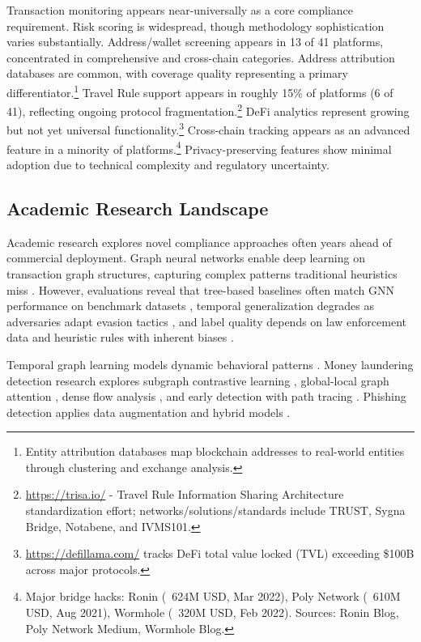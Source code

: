 \documentclass[conference,compsoc]{IEEEtran}
\begin{document}
Transaction monitoring appears near-universally as a core compliance requirement. Risk scoring is widespread, though methodology sophistication varies substantially. Address/wallet screening appears in 13 of 41 platforms, concentrated in comprehensive and cross-chain categories. Address attribution databases are common, with coverage quality representing a primary differentiator.\footnote{Entity attribution databases map blockchain addresses to real-world entities through clustering and exchange analysis.} Travel Rule support appears in roughly 15\% of platforms (6 of 41), reflecting ongoing protocol fragmentation.\footnote{\url{https://trisa.io/} - Travel Rule Information Sharing Architecture standardization effort; networks/solutions/standards include TRUST, Sygna Bridge, Notabene, and IVMS101.} DeFi analytics represent growing but not yet universal functionality.\footnote{\url{https://defillama.com/} tracks DeFi total value locked (TVL) exceeding \$100B across major protocols.} Cross-chain tracking appears as an advanced feature in a minority of platforms.\footnote{Major bridge hacks: Ronin (~624M USD, Mar 2022), Poly Network (~610M USD, Aug 2021), Wormhole (~320M USD, Feb 2022). Sources: Ronin Blog, Poly Network Medium, Wormhole Blog.} Privacy-preserving features show minimal adoption due to technical complexity and regulatory uncertainty.

\subsection{Academic Research Landscape}

Academic research explores novel compliance approaches often years ahead of commercial deployment. Graph neural networks enable deep learning on transaction graph structures, capturing complex patterns traditional heuristics miss \cite{weber2019antimoneylaunderingbitcoin,azad2025machinelearningblockchain,ancelotti2024reviewblockchainapplication,damico2025blockchainnetworkanalysis}. However, evaluations reveal that tree-based baselines often match GNN performance on benchmark datasets \cite{alarab2020comparativeanalysisusing,pourhabibi2020frauddetectionsystematic}, temporal generalization degrades as adversaries adapt evasion tactics \cite{monamo2016unsupervisedlearningrobust}, and label quality depends on law enforcement data and heuristic rules with inherent biases \cite{weber2019antimoneylaunderingbitcoin}.

Temporal graph learning models dynamic behavioral patterns \cite{arnold2024insightscaveatsmining,luo2025optimizingblockchainanalysis}. Money laundering detection research explores subgraph contrastive learning \cite{ouyang2024bitcoinmoneylaundering}, global-local graph attention \cite{li2025globallocalgraphattention}, dense flow analysis \cite{lin2024denseflowspottingcryptocurrency}, and early detection with path tracing \cite{cheng2023evolvepathtracer,cheng2024earlydetectionmalicious}. Phishing detection applies data augmentation and hybrid models \cite{chen2020phishingscamdetection,chen2024ethereumphishingscam,liu2024detectionethereumphishing}.
\end{document}
